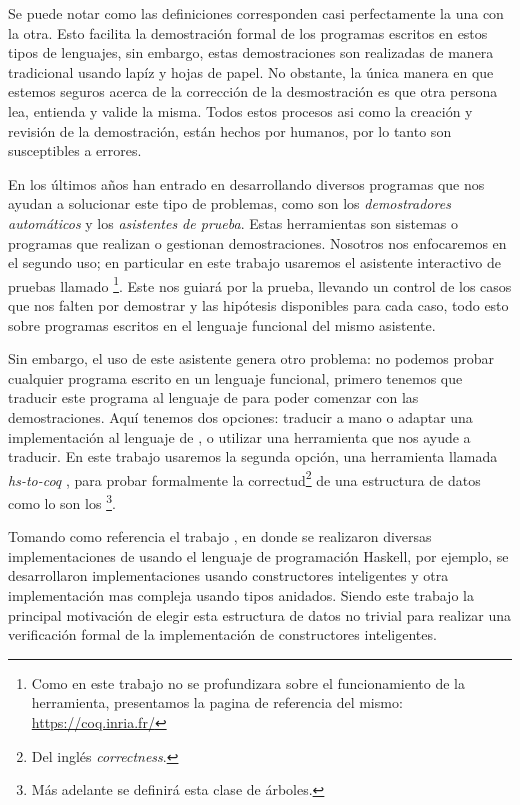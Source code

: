 Se puede notar como las definiciones corresponden casi perfectamente la una con la otra. Esto 
facilita la demostraci\'on formal de los programas escritos en estos tipos de lenguajes, sin
embargo, estas demostraciones son realizadas de manera tradicional usando lap\'iz y hojas de papel.
No obstante, la \'unica manera en que estemos seguros acerca de la correcci\'on de la
desmostraci\'on es que otra persona lea, entienda y valide la misma. Todos estos procesos asi como 
la creaci\'on y revisi\'on de la demostraci\'on, están hechos por humanos, por lo tanto son 
susceptibles a errores.

En los últimos años han entrado en desarrollando diversos programas que nos ayudan a solucionar este
tipo de problemas, como son los \textit{demostradores autom\'aticos} y los \textit{asistentes de
prueba}. Estas herramientas son sistemas o programas que realizan o gestionan demostraciones. 
Nosotros nos enfocaremos en el segundo uso; en particular en este trabajo usaremos el asistente 
interactivo de pruebas llamado {\coq}\footnote{Como en este trabajo no se profundizara sobre el 
funcionamiento de la herramienta, presentamos la pagina de referencia del mismo: 
\url{https://coq.inria.fr/}}. Este nos guiar\'a por la prueba, llevando un control de 
los casos que nos falten por demostrar y las hip\'otesis disponibles para cada caso, todo esto sobre 
programas escritos en el lenguaje funcional del mismo asistente.

Sin embargo, el uso de este asistente genera otro problema: no podemos probar cualquier programa
escrito en un lenguaje funcional, primero tenemos que traducir este programa al lenguaje de {\coq}
para poder comenzar con las demostraciones. Aquí tenemos dos opciones: traducir a mano o adaptar 
una implementación al lenguaje de {\coq}, o utilizar una herramienta que nos ayude a traducir. En 
este trabajo usaremos la segunda opci\'on, una herramienta llamada \textit{hs-to-coq} \cite{thrc}, 
para probar formalmente la correctud\footnote{Del ingl\'es \textit{correctness}.} de una estructura 
de datos como lo son los {\arns}\footnote{M\'as adelante se definir\'a esta clase de \'arboles.}.

Tomando como referencia el trabajo \cite{tesisG}, en donde se realizaron diversas implementaciones 
de {\arns} usando el lenguaje de programaci\'on Haskell, por ejemplo, se desarrollaron 
implementaciones usando constructores inteligentes y otra implementaci\'on mas compleja usando tipos 
anidados. Siendo este trabajo la principal motivaci\'on de elegir esta estructura de datos no 
trivial para realizar una verificaci\'on formal de la implementaci\'on de constructores 
inteligentes.

